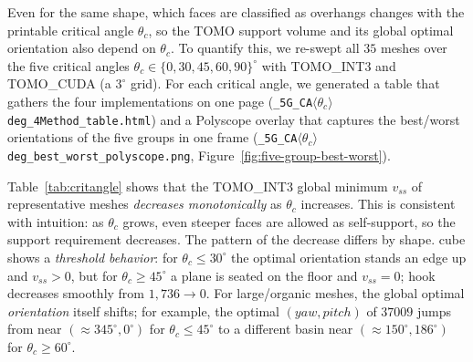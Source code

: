 \documentclass[11pt,a4paper]{article}
\begin{document}
Even for the same shape, which faces are classified as overhangs changes with the printable critical angle $\theta_c$,
so the TOMO support volume and its global optimal orientation also depend on $\theta_c$.
To quantify this, we re-swept all $35$ meshes over the five critical angles $\theta_c\in\{0,30,45,60,90\}^\circ$
with TOMO\_INT3 and TOMO\_CUDA (a $3^\circ$ grid).
For each critical angle, we generated a table that gathers the four implementations on one page (\texttt{\_5G\_CA$\langle\theta_c\rangle$deg\_4Method\_table.html})
and a Polyscope overlay that captures the best/worst orientations of the five groups in one frame
(\texttt{\_5G\_CA$\langle\theta_c\rangle$deg\_best\_worst\_polyscope.png}, Figure~\ref{fig:five-group-best-worst}).

Table~\ref{tab:critangle} shows that the TOMO\_INT3 global minimum $v_{ss}$ of representative meshes \emph{decreases monotonically} as $\theta_c$ increases.
This is consistent with intuition: as $\theta_c$ grows, even steeper faces are allowed as self-support, so the support requirement decreases.
The pattern of the decrease differs by shape.
cube shows a \emph{threshold behavior}: for $\theta_c\le30^\circ$ the optimal orientation stands an edge up and $v_{ss}>0$, but
for $\theta_c\ge45^\circ$ a plane is seated on the floor and $v_{ss}=0$;
hook decreases smoothly from $1{,}736\to0$.
For large/organic meshes, the global optimal \emph{orientation} itself shifts;
for example, the optimal $(yaw,pitch)$ of $37009$ jumps from near $(\approx\!345^\circ,0^\circ)$ for $\theta_c\le45^\circ$
to a different basin near $(\approx\!150^\circ,186^\circ)$ for $\theta_c\ge60^\circ$.
\end{document}
